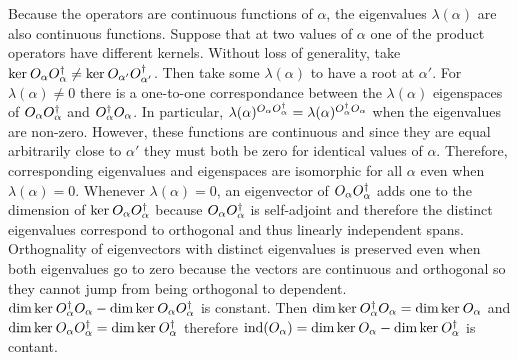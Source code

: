 \documentclass[12pt]{extarticle}
\begin{document}
\begin{enumerate}
Because the operators are continuous functions of $\alpha$, the eigenvalues $\lambda(\alpha)$ are also continuous functions. Suppose that at two values of $\alpha$ one of the product operators have different kernels. Without loss of generality, take $\mathrm{ker} \: O_\alpha O_\alpha^{\dagger} \neq \mathrm{ker} \:  O_{\alpha '} O_{\alpha '}^{\dagger}$. Then take some $\lambda (\alpha)$ to have a root at $\alpha '$. For $\lambda(\alpha) \neq 0$ there is a one-to-one correspondance between the $\lambda(\alpha)$ eigenspaces of $O_\alpha O_\alpha^{\dagger}$ and $O_\alpha^{\dagger} O_\alpha$. In particular, $\lambda(\alpha)^{O_\alpha O_\alpha^{\dagger}} = \lambda(\alpha)^{O_\alpha^{\dagger} O_\alpha}$ when the eigenvalues are non-zero. However, these functions are continuous and since they are equal arbitrarily close to $\alpha '$ they must both be zero for identical values of $\alpha$. Therefore, corresponding eigenvalues and eigenspaces are isomorphic for all $\alpha$ even when $\lambda(\alpha) = 0$. Whenever $\lambda (\alpha) = 0$, an eigenvector of $O_\alpha O_\alpha^{\dagger}$ adds one to the dimension of $\mathrm{ker} \: O_\alpha O_\alpha^{\dagger}$ because $O_\alpha O_\alpha^{\dagger}$ is self-adjoint and therefore the distinct eigenvalues correspond to orthogonal and thus linearly independent spans. Orthognality of eigenvectors with distinct eigenvalues is preserved even when both eigenvalues go to zero because the vectors are continuous and orthogonal so they cannot jump from being orthogonal to dependent. $\dim{\mathrm{ker} \: O_\alpha^{\dagger}O_\alpha} - \dim{\mathrm{ker} \: O_\alpha O_\alpha^{\dagger}}$ is constant. Then $\dim{\mathrm{ker} \: O_\alpha^{\dagger}O_\alpha} = \dim{\mathrm{ker} \: O_\alpha}$ and $\dim{\mathrm{ker} \: O_\alpha O_\alpha^{\dagger}} = \dim{\mathrm{ker} \: O_\alpha^{\dagger}}$ therefore $\mathrm{ind}(O_\alpha) = \dim{\mathrm{ker} \: O_\alpha} - \dim{\mathrm{ker} \: O_\alpha^{\dagger}}$ is contant.  

\end{enumerate}
\end{document}
